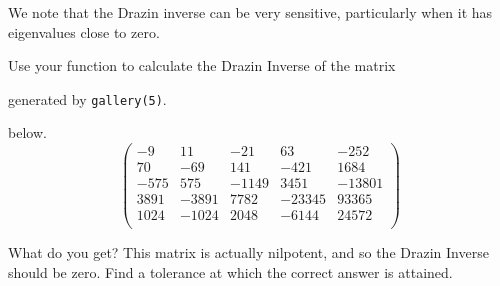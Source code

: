 We note that the Drazin inverse can be very sensitive, particularly when it has eigenvalues close to zero.

\begin{problem}
Use your function to calculate the Drazin Inverse of the matrix \begin{matlab}generated by {\tt gallery(5)}.\end{matlab}\begin{python} below.
\[                                                          
\begin{pmatrix}
-9&11&-21&63&-252 \\
70&-69&141&-421&1684 \\
-575&575&-1149&3451&-13801 \\
3891&-3891&7782&-23345&93365 \\
1024&-1024&2048&-6144&24572 \\
\end{pmatrix}
\]                                                           \end{python}
What do you get? This matrix is actually nilpotent, and so the Drazin Inverse should be zero. Find a tolerance at which the correct answer is attained.
\end{problem}





